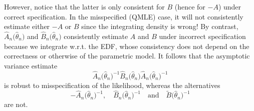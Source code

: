 \documentclass[11pt,letterpaper,reqno,oneside]{article}
\begin{document}
However, notice that the latter is only consistent for $B$ (hence for $-A$) under correct specification. In the misspecified (QMLE) case, it will not consistently estimate either $-A$ or $B$ since the integrating density is wrong! By contrast, $\widehat{A}_n\bigl( \widehat{\theta}_n \bigr)$ and $\widehat{B}_n\bigl( \widehat{\theta}_n \bigr)$ consistently estimate $A$ and $B$ under incorrect specification because we integrate w.r.t. the EDF, whose consistency does not depend on the correctness or otherwise of the parametric model. It follows that the asymptotic variance estimate
%
\begin{equation*}
	\widehat{A}_n\bigl( \widehat{\theta}_n \bigr)^{-1} 
	\widehat{B}_n\bigl( \widehat{\theta}_n \bigr) 
	\widehat{A}_n\bigl( \widehat{\theta}_n \bigr)^{-1}
\end{equation*}
%
is robust to misspecification of the likelihood, whereas the alternatives
%
\begin{equation*}
	-\widehat{A}_n\bigl( \widehat{\theta}_n \bigr)^{-1} 
	,\quad
	\widehat{B}_n\bigl( \widehat{\theta}_n \bigr)^{-1}
	\quad\text{and}\quad
	\widetilde{B}\bigl( \widehat{\theta}_n \bigr)^{-1}
\end{equation*}
%
are not.
\end{document}
